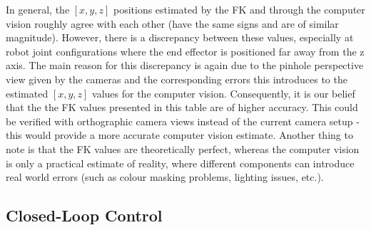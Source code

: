 \documentclass[11pt]{article}
\begin{document}
In general, the $[x,y,z]$ positions estimated by the FK and through the computer vision roughly agree with each other (have the same signs and are of similar magnitude). However, there is a discrepancy between these values, especially at robot joint configurations where the end effector is positioned far away from the z axis. The main reason for this discrepancy is again due to the pinhole perspective view given by the cameras and the corresponding errors this introduces to the estimated $[x,y,z]$ values for the computer vision. Consequently, it is our belief that the the FK values presented in this table are of higher accuracy. This could be verified with orthographic camera views instead of the current camera setup - this would provide a more accurate computer vision estimate. Another thing to note is that the FK values are theoretically perfect, whereas the computer vision is only a practical estimate of reality, where different components can introduce real world errors (such as colour masking problems, lighting issues, etc.).

\subsection{Closed-Loop Control}
\end{document}
